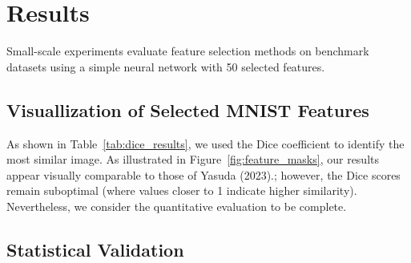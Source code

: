 \documentclass[a4paper,twocolumn]{article} %
\begin{document}
\section{Results}
Small-scale experiments evaluate feature selection methods on benchmark datasets using a simple neural network with 50 selected features.
\subsection{Visuallization of Selected MNIST Features}

As shown in Table~\ref{tab:dice_results}, we used the Dice coefficient to identify the most similar image. As illustrated in Figure~\ref{fig:feature_masks}, our results appear visually comparable to those of Yasuda (2023).; however, the Dice scores remain suboptimal (where values closer to 1 indicate higher similarity). Nevertheless, we consider the quantitative evaluation to be complete.


\begin{table}[ht]
\centering
\caption{Comparison of accuracy using all features. p-values are from one-sample t-tests against Lemhadri (2021)~\cite{lemhadri2021lassonet} and Yasuda (2023)'s reported means.}
\label{tab:all-feature-pval}
\end{table}

\subsection{Statistical Validation}
\end{document}
